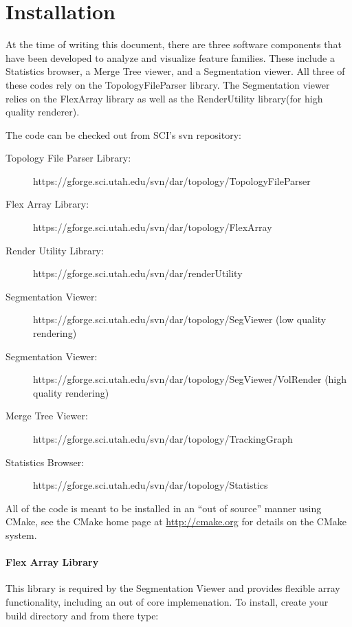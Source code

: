 \section{Installation} \label{sec:installation}

At the time of writing this document, there are three software 
components that have been developed to analyze and visualize feature families.  
These include a Statistics browser, a Merge Tree viewer, and a Segmentation
viewer.  All three of these codes rely on the TopologyFileParser library.  The Segmentation
viewer relies on the FlexArray library as well as the RenderUtility library(for high quality renderer).


The code can be checked out from SCI's svn repository: 

\small{
\begin{description}
\item[Topology File Parser Library:]https://gforge.sci.utah.edu/svn/dar/topology/TopologyFileParser

\item[Flex Array Library:]https://gforge.sci.utah.edu/svn/dar/topology/FlexArray

\item[Render Utility Library:]https://gforge.sci.utah.edu/svn/dar/renderUtility

\item[Segmentation Viewer:]https://gforge.sci.utah.edu/svn/dar/topology/SegViewer (low quality rendering)

\item[Segmentation Viewer:]https://gforge.sci.utah.edu/svn/dar/topology/SegViewer/VolRender (high quality rendering)

\item[Merge Tree Viewer:]https://gforge.sci.utah.edu/svn/dar/topology/TrackingGraph

\item[Statistics Browser:]https://gforge.sci.utah.edu/svn/dar/topology/Statistics
\end{description}
}

All of the code is meant to be installed in an ``out of source'' manner using CMake, see the
CMake home page at \url{http://cmake.org} for details on the CMake system.  

\paragraph{Flex Array Library} 
This library is required by the Segmentation Viewer and provides flexible array functionality, 
including an out of core implemenation.  To install, create your build directory and from there
type:

